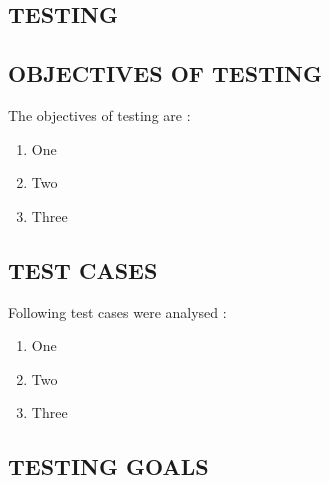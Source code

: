 \begin{center}
	\chapter{TESTING}
\end{center}
\section{OBJECTIVES OF TESTING}
The objectives of testing are :
\begin{enumerate}
	\item One
	\item Two
	\item Three
\end{enumerate}

\section{TEST CASES}
Following test cases were analysed :
\begin{enumerate}
	\item One
	\item Two
	\item Three
\end{enumerate}

\section{TESTING GOALS}